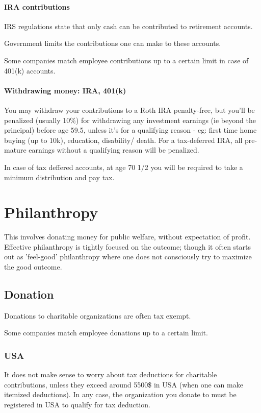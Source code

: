 \documentclass[oneside, article]{memoir}
\begin{document}
\subsubsection{IRA contributions}
IRS regulations state that only cash can be contributed to retirement accounts.

Government limits the contributions one can make to these accounts.

Some companies match employee contributions up to a certain limit in case of 401(k) accounts.

\subsubsection{Withdrawing money: IRA, 401(k)}
You may withdraw your contributions to a Roth IRA penalty-free, but you'll be penalized (usually 10\%) for withdrawing any investment earnings (ie beyond the principal) before age 59.5, unless it's for a qualifying reason - eg: first time home buying (up to 10k), education, disability/ death. For a tax-deferred IRA, all pre-mature earnings without a qualifying reason will be penalized.

In case of tax deffered accounts, at age 70 1/2 you will be required to take a minimum distribution and pay tax.

\chapter{Philanthropy}
This involves donating money for public welfare, without expectation of profit. Effective philanthropy is tightly focused on the outcome; though it often starts out as 'feel-good' philanthropy where one does not consciously try to maximize the good outcome.

\section{Donation}
Donations to charitable organizations are often tax exempt.

Some companies match employee donations up to a certain limit.

\subsection{USA}
It does not make sense to worry about tax deductions for charitable contributions, unless they exceed around 5500\$ in USA (when one can make itemized deductions). In any case, the organization you donate to must be registered in USA to qualify for tax deduction.
\end{document}
